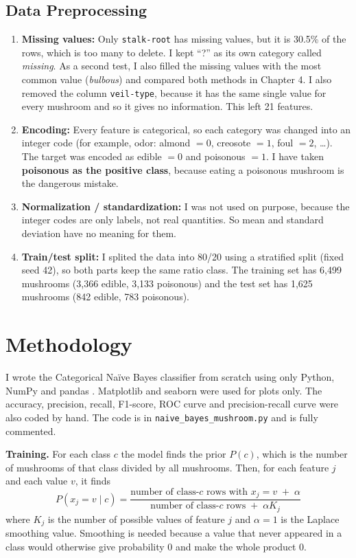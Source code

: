 \documentclass[12pt,a4paper]{article}
\begin{document}
\subsection{Data Preprocessing}
\begin{enumerate}[label=\alph*)]
  \item \textbf{Missing values:} Only \texttt{stalk-root} has missing values, but it is 30.5\% of the rows, which is too many to delete. I kept ``?'' as its own category called \emph{missing}. As a second test, I also filled the missing values with the most common value (\emph{bulbous}) and compared both methods in Chapter 4. I also removed the column \texttt{veil-type}, because it has the same single value for every mushroom and so it gives no information. This left 21 features.
  \item \textbf{Encoding:} Every feature is categorical, so each category was changed into an integer code (for example, odor: almond $=0$, creosote $=1$, foul $=2$, \dots). The target was encoded as edible $=0$ and poisonous $=1$. I have taken \textbf{poisonous as the positive class}, because eating a poisonous mushroom is the dangerous mistake.
  \item \textbf{Normalization / standardization:} I was not used on purpose, because the integer codes are only labels, not real quantities. So mean and standard deviation have no meaning for them.
  \item \textbf{Train/test split:} I splited the data into 80/20 using a stratified split (fixed seed 42), so both parts keep the same ratio class. The training set has 6,499 mushrooms (3,366 edible, 3,133 poisonous) and the test set has 1,625 mushrooms (842 edible, 783 poisonous).
\end{enumerate}

\section{Methodology}

I wrote the Categorical Na\"ive Bayes classifier from scratch using only Python, NumPy \cite{harris2020} and pandas \cite{mckinney2010}. Matplotlib \cite{hunter2007} and seaborn \cite{waskom2021} were used for plots only. The accuracy, precision, recall, F1-score, ROC curve and precision-recall curve were also coded by hand. The code is in \texttt{naive\_bayes\_mushroom.py} and is fully commented.

\textbf{Training.} For each class $c$ the model finds the prior $P(c)$, which is the number of mushrooms of that class divided by all mushrooms. Then, for each feature $j$ and each value $v$, it finds
\[
P(x_j=v \mid c)=\frac{\text{number of class-}c\text{ rows with } x_j=v \; + \;\alpha}{\text{number of class-}c\text{ rows} \; + \;\alpha K_j}
\]
where $K_j$ is the number of possible values of feature $j$ and $\alpha=1$ is the Laplace smoothing value. Smoothing is needed because a value that never appeared in a class would otherwise give probability 0 and make the whole product 0.
\end{document}
